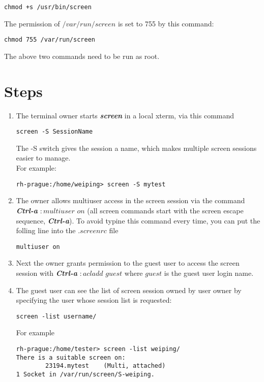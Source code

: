 \documentclass[11pt]{article}
\begin{document}
\begin{verbatim}chmod +s /usr/bin/screen \end{verbatim}
%
The permission of $/var/run/screen $ is set to 755 by this command:

\begin{verbatim}chmod 755 /var/run/screen \end{verbatim}
%
The above two commands need to be run as root.

\section{Steps}
\renewcommand*\theenumi{\Alph{enumi}}
\renewcommand*\labelenumi{\theenumi)}
\begin{enumerate}
	\item The terminal owner starts \textbf{\textit{screen}} in a local xterm,   via this command
	 \begin{verbatim}screen -S SessionName\end{verbatim}
	The -S switch gives the session a name, which makes multiple screen sessions easier to manage.\\
	For example:
\begin{verbatim}
rh-prague:/home/weiping> screen -S mytest
\end{verbatim}

	\item The owner allows multiuser access in the screen session via the command \textbf{\textit{Ctrl-a}} $:multiuser$ $on$ (all screen commands start with the screen escape sequence, \textbf{\textit{Ctrl-a}}).
%
To avoid typine this command every time, you can put the folling line into the $.screenrc$ file
\begin{verbatim}multiuser on \end{verbatim}

	\item Next the owner grants permission to the guest user to access the screen session with \textbf{\textit{Ctrl-a}} $:acladd$ $guest$ where $guest$ is the guest user login name.

	\item The guest user can see the list of screen session owned by user owner by specifying
the user whose session list is requested:
\begin{verbatim}screen -list username/ \end{verbatim}
For example
\begin{verbatim}
rh-prague:/home/tester> screen -list weiping/
There is a suitable screen on:
        23194.mytest    (Multi, attached)
1 Socket in /var/run/screen/S-weiping.
\end{verbatim}



\end{enumerate}
\end{document}

